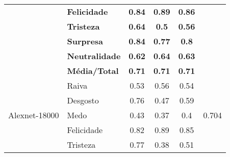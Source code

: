 \begin{table}[]
\begin{tabular}{llcccc}
                                        & \textbf{Felicidade}   & \textbf{0.84}                         & \textbf{0.89}                          & \textbf{0.86}                         &                                       \\
                                        & \textbf{Tristeza}     & \textbf{0.64}                         & \textbf{0.5}                           & \textbf{0.56}                         &                                       \\
                                        & \textbf{Surpresa}     & \textbf{0.84}                         & \textbf{0.77}                          & \textbf{0.8}                          &                                       \\
                                        & \textbf{Neutralidade} & \textbf{0.62}                         & \textbf{0.64}                          & \textbf{0.63}                         &                                       \\
                                        & \textbf{Média/Total}  & \textbf{0.71}                         & \textbf{0.71}                          & \textbf{0.71}                         &                                       \\ \hline
\multirow{8}{*}{Alexnet-18000}          & Raiva                 & 0.53                                  & 0.56                                   & 0.54                                  & \multirow{8}{*}{0.704}                \\
                                        & Desgosto              & 0.76                                  & 0.47                                   & 0.59                                  &                                       \\
                                        & Medo                  & 0.43                                  & 0.37                                   & 0.4                                   &                                       \\
                                        & Felicidade            & 0.82                                  & 0.89                                   & 0.85                                  &                                       \\
                                        & Tristeza              & 0.77                                  & 0.38                                   & 0.51                                  &                                       \\

\end{tabular}
\end{table}
